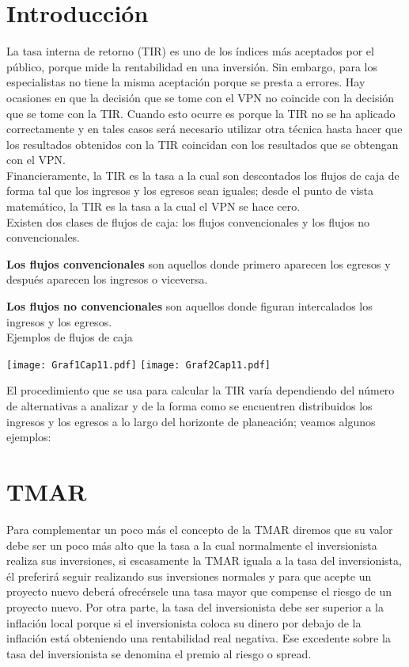 \section{Introducción}
La tasa interna de retorno (TIR) es uno de los índices más aceptados por el público, porque mide la rentabilidad en una inversión. Sin embargo, para los especialistas no tiene la misma aceptación porque se presta a errores. Hay ocasiones en que la decisión que se tome con el VPN no coincide con la decisión que se tome con la TIR. Cuando esto ocurre es porque la TIR no se ha aplicado correctamente y en tales casos será necesario utilizar otra técnica hasta hacer que los resultados obtenidos con la TIR coincidan con los resultados que se obtengan con el VPN.\\

Financieramente, la TIR es la tasa a la cual son descontados los flujos de caja de forma tal que los ingresos y los egresos sean iguales; desde el punto de vista matemático, la TIR es la tasa a la cual el VPN se hace cero.\\

Existen dos clases de flujos de caja: los flujos convencionales y los flujos no convencionales.

\textbf{Los flujos convencionales} son aquellos donde primero aparecen los egresos y después aparecen los ingresos o viceversa.

\textbf{Los flujos no convencionales} son aquellos donde figuran intercalados los ingresos y los egresos.\\

Ejemplos de flujos de caja

\begin{center}
	\texttt{[image: Graf1Cap11.pdf]}
	\texttt{[image: Graf2Cap11.pdf]}
\end{center}

El procedimiento que se usa para calcular la TIR varía dependiendo del número de alternativas a analizar y de la forma como se encuentren distribuidos los ingresos y los egresos a lo largo del horizonte de planeación; veamos algunos ejemplos:






\section{TMAR}
Para complementar un poco más el concepto de la TMAR diremos que su valor debe ser un poco más alto que la tasa a la cual normalmente el inversionista realiza sus inversiones, si escasamente la TMAR iguala a la tasa del inversionista, él preferirá seguir realizando sus inversiones normales y para que acepte un proyecto nuevo deberá ofrecérsele una tasa mayor que compense el riesgo de un proyecto nuevo. Por otra parte, la tasa del inversionista debe ser superior a la inflación local porque si el inversionista coloca su dinero por debajo de la inflación está obteniendo una rentabilidad real negativa. Ese excedente sobre la tasa del inversionista se denomina el premio al riesgo o spread.\\

